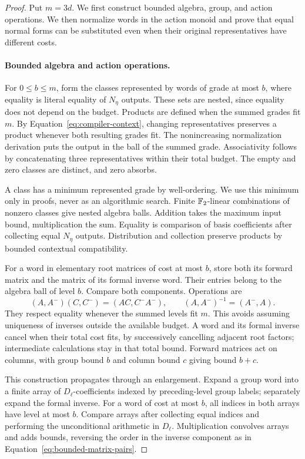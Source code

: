 \begin{proof}
Put $m=3d$.  We first construct bounded algebra, group, and action
operations.  We then normalize words in the action monoid and prove
that equal normal forms can be substituted even when their original
representatives have different costs.

\paragraph{Bounded algebra and action operations.}
For $0\leq b\leq m$, form the classes represented
by words of grade at most $b$, where equality is literal
equality of $N_\eta$ outputs.  These sets are nested, since
equality does not depend on the budget.  Products are defined
when the summed grades fit $m$.  By
Equation~\eqref{eq:compiler-context}, changing representatives
preserves a product whenever both resulting grades fit.
The nonincreasing normalization derivation puts the output
in the ball of the summed grade.  Associativity follows by
concatenating three representatives within their total budget.
The empty and zero classes are distinct, and zero absorbs.

A class has a minimum represented grade by well-ordering.
We use this minimum only in proofs, never as an algorithmic
search.  Finite $\mathbb F_2$-linear combinations of nonzero classes
give nested algebra balls.  Addition takes the maximum input
bound, multiplication the sum.  Equality is comparison of
basis coefficients after collecting equal $N_\eta$ outputs.
Distribution and collection preserve products by bounded
contextual compatibility.

For a word in elementary root matrices of cost at most $b$,
store both its forward matrix and the matrix of its formal
inverse word.  Their entries belong to the algebra ball of
level $b$.  Compare both components.  Operations are
\begin{equation}\label{eq:bounded-matrix-pairs}
 (A,A^-)(C,C^-)=(AC,C^-A^-),\qquad
 (A,A^-)^{-1}=(A^-,A).
\end{equation}
They respect equality whenever the summed levels fit $m$.
This avoids assuming uniqueness of inverses outside the
available budget.  A word and its formal inverse cancel
when their total cost fits, by successively cancelling
adjacent root factors; intermediate calculations stay in
that total bound.  Forward matrices act on columns, with
group bound $b$ and column bound $c$ giving bound $b+c$.

This construction propagates through an enlargement.
Expand a group word into a finite array of $D_\ell$-coefficients
indexed by preceding-level group labels; separately expand
the formal inverse.  For a word of cost at most $b$, all
indices in both arrays have level at most $b$.  Compare
arrays after collecting equal indices and performing the
unconditional arithmetic in $D_\ell$.  Multiplication
convolves arrays and adds bounds, reversing the order in
the inverse component as in
Equation~\eqref{eq:bounded-matrix-pairs}.


\end{proof}
